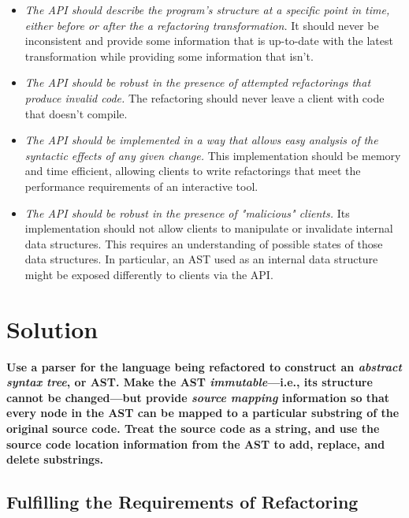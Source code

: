 \documentclass[prodmode]{acmlarge}
\begin{document}
\begin{itemize}
    \item \textit{The API should describe the program's structure at a specific 
        point in time, either before or after the a refactoring transformation.} 
        It should never be inconsistent and provide some information that is
        up-to-date with the latest transformation while providing some
        information that isn't.
\end{itemize}
\clearpage
\begin{itemize}
    \item \textit{The API should be robust in the presence of attempted refactorings
        that produce invalid code.} The refactoring should never leave a 
        client with code that doesn't compile. 
    \item \textit{The API should be implemented in a way that allows easy analysis of
        the syntactic effects of any given change.} This implementation should
        be memory and time efficient, allowing clients to write refactorings
        that meet the performance requirements of an interactive tool.
    \item \textit{The API should be robust in the presence of "malicious" clients.}
        Its implementation should not allow clients to manipulate or 
        invalidate internal data structures. This requires an understanding of
        possible states of those data structures. In particular, an AST used
        as an internal data structure might be exposed differently to clients
        via the API. 
\end{itemize}

\section{Solution}

\textbf{Use a parser for the language being refactored to construct an
\textit{abstract syntax tree}, or \textup{AST}.  Make the AST
\textit{immutable}---i.e., its structure cannot be changed---but provide
\textit{source mapping} information so that every node in the AST can be mapped
to a particular substring of the original source code. Treat the source code
as a string, and use the source code location information from the AST to
add, replace, and delete substrings.}

\subsection{Fulfilling the Requirements of Refactoring}
\end{document}
